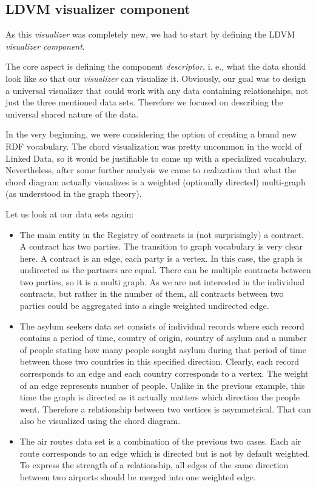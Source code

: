 \subsection{LDVM visualizer component}

As this \emph{visualizer} was completely new, we had to start by defining the LDVM \emph{visualizer component}.

The core aspect is defining the component \emph{descriptor}, i. e., what the data should look like so that our \emph{visualizer} can visualize it. Obviously, our goal was to design a universal visualizer that could work with any data containing relationships, not just the three mentioned data sets. Therefore we focused on describing the universal shared nature of the data.

In the very beginning, we were considering the option of creating a brand new RDF vocabulary. The chord visualization was pretty uncommon in the world of Linked Data, so it would be justifiable to come up with a specialized vocabulary. Nevertheless, after some further analysis we came to realization that what the chord diagram actually visualizes is a weighted (optionally directed) multi-graph (as understood in the graph theory).

Let us look at our data sets again:

\begin{itemize}
\item The main entity in the Registry of contracts is (not surprisingly) a contract. A contract has two parties. The transition to graph vocabulary is very clear here. A contract is an edge, each party is a vertex. In this case, the graph is undirected as the partners are equal. There can be multiple contracts between two parties, so it is a multi graph. As we are not interested in the individual contracts, but rather in the number of them, all contracts between two parties could be aggregated into a single weighted undirected edge.
\item The asylum seekers data set consists of individual records where each record contains a period of time, country of origin, country of asylum and a number of people stating how many people sought asylum during that period of time between those two countries in this specified direction. Clearly, each record corresponds to an edge and each country corresponds to a vertex. The weight of an edge represents number of people. Unlike in the previous example, this time the graph is directed as it actually matters which direction the people went. Therefore a relationship between two vertices is asymmetrical. That can also be visualized using the chord diagram.
\item The air routes data set is a combination of the previous two cases. Each air route corresponds to an edge which is directed but is not by default weighted. To express the strength of a relationship, all edges of the same direction between two airports should be merged into one weighted edge.
\end{itemize}

